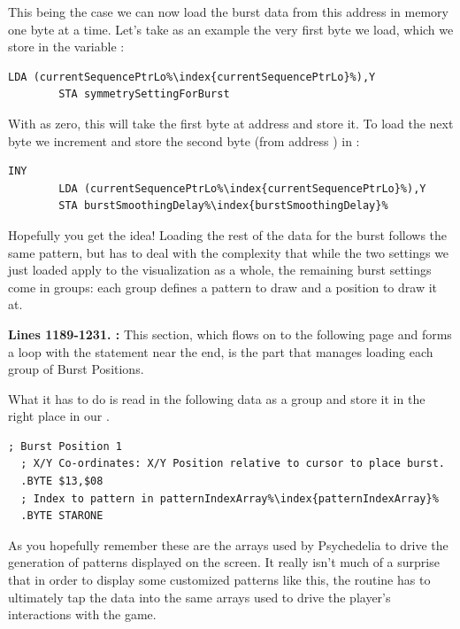 This being the case we can now load the burst data from this address in memory one byte at a time. Let's take as an example the
very first byte we load, which we store in the variable :
\begin{lstlisting}[escapechar=\%]
        LDA (currentSequencePtrLo%\index{currentSequencePtrLo}%),Y
        STA symmetrySettingForBurst
\end{lstlisting}

With  as zero, this will take the first byte at address  and store it. To load the next byte we increment 
and store the second byte (from address ) in :
\begin{lstlisting}[escapechar=\%]
        INY 
        LDA (currentSequencePtrLo%\index{currentSequencePtrLo}%),Y
        STA burstSmoothingDelay%\index{burstSmoothingDelay}%
\end{lstlisting}

Hopefully you get the idea! Loading the rest of the data for the burst follows the same pattern, but has to deal with the complexity that
while the two settings we just loaded apply to the visualization as a whole, the remaining burst settings come in groups: each group defines
a pattern to draw and a position to draw it at.

\textbf{Lines 1189-1231. :} This section, which flows on to the following page and forms a loop with the
statement  near the end, is the part that manages loading each group of Burst Positions. 

What it has to do is read in the following data as a group and store it in the right place in our .
\begin{lstlisting}[escapechar=\%]
  ; Burst Position 1
  ; X/Y Co-ordinates: X/Y Position relative to cursor to place burst.
  .BYTE $13,$08
  ; Index to pattern in patternIndexArray%\index{patternIndexArray}%
  .BYTE STARONE
\end{lstlisting}
As you hopefully remember these are the arrays used by Psychedelia to drive the generation of patterns displayed on the screen. It really isn't much
of a surprise that in order to display some customized patterns like this, the routine has to ultimately tap the data into the same arrays used
to drive the player's interactions with the game.

